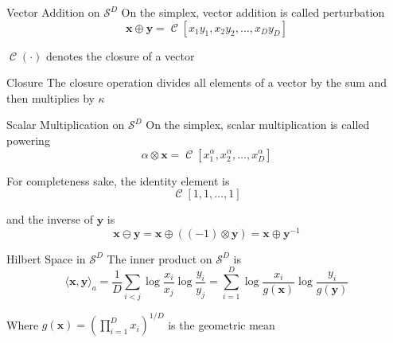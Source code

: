 \documentclass[dark]{cgem-presentation}
\DeclareMathOperator{\closure}{\operatorname{\mathcal{C}}}
\begin{document}
\begin{frame}{Vector Addition on $\mathcal{S}^D$}
	\LARGE
	On the simplex, vector addition is called
	\textcolor{ThirdColor}{perturbation}
	\begin{equation*}
		\mathbf{x} \oplus \mathbf{y} = \closure
		[x_1 y_1, x_2 y_2, \ldots , x_D y_D]
	\end{equation*}

	\vspace{4mm}
	$\closure(\cdot)$ denotes the \textcolor{ThirdColor}{closure}
	of a vector
\end{frame}

\begin{frame}{Closure}
	\LARGE
	The \textcolor{ThirdColor}{closure} operation divides
	all elements of a vector by the sum and then multiplies
	by $\kappa$
\end{frame}

\begin{frame}{Scalar Multiplication on $\mathcal{S}^D$}
	\LARGE
	On the simplex, scalar multiplication is called
	\textcolor{ThirdColor}{powering}
	\begin{equation*}
		\alpha \otimes \mathbf{x} = \closure[ x_1^\alpha,
		x_2^\alpha, \ldots , x_D^\alpha]
	\end{equation*}
\end{frame}

\begin{frame}
	\LARGE
	\vspace{1cm}
	For completeness sake, the identity element is
	\begin{equation*}
		\closure[1, 1, \ldots, 1]
	\end{equation*}

	\vspace{5mm}
	and the inverse of $\mathbf{y}$ is
	\begin{equation*}
		\mathbf{x} \ominus \mathbf{y} = \mathbf{x} \oplus
		((-1) \otimes \mathbf{y}) = \mathbf{x} \oplus
		\mathbf{y}^{-1}
	\end{equation*}
\end{frame}

\begin{frame}{Hilbert Space in $\mathcal{S}^D$}
	\LARGE
	The inner product on $\mathcal{S}^D$ is
	\begin{equation*}
		\langle \mathbf{x}, \mathbf{y} \rangle_a = 
		\frac{1}{D} \sum_{i < j} \log \frac{x_i}{x_j} 
		\log \frac{y_i}{y_j} = \sum^D_{i=1}
		\log \frac{x_i}{g(\mathbf{x})} \log \frac{y_i}
		{g(\mathbf{y})}
	\end{equation*}

	\vspace{5mm}
	Where $g(\mathbf{x}) = ( \prod_{i=1}^D x_i )^{1/D}$ is the 
	geometric mean
\end{frame}
\end{document}
